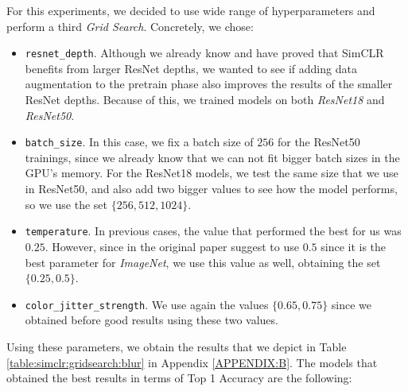 For this experiments, we decided to use wide range of hyperparameters and perform a third \emph{Grid Search}. Concretely, we chose:
\begin{itemize}
\item \lstinline{resnet_depth}. Although we already know and have proved that SimCLR benefits from larger ResNet depths, we wanted to see if adding data augmentation to the pretrain phase also improves the results of the smaller ResNet depths. Because of this, we trained models on both \emph{ResNet18} and \emph{ResNet50}.
\item \lstinline{batch_size}. In this case, we fix a batch size of $256$ for the ResNet50 trainings, since we already know that we can not fit bigger batch sizes in the GPU's memory. For the ResNet18 models, we test the same size that we use in ResNet50, and also add two bigger values to see how the model performs, so we use the set $\{256,512,1024\}$.
\item \lstinline{temperature}. In previous cases, the value that performed the best for us was $0.25$. However, since in the original paper suggest to use $0.5$ since it is the best parameter for \emph{ImageNet}, we use this value as well, obtaining the set $\{0.25,0.5\}$.
\item \lstinline{color_jitter_strength}. We use again the values $\{0.65,0.75\}$ since we obtained before good results using these two values.
\end{itemize}

Using these parameters, we obtain the results that we depict in Table \ref{table:simclr:gridsearch:blur} in Appendix \ref{APPENDIX:B}. The models that obtained the best results in terms of Top 1 Accuracy are the following:

\begin{table}[H]
    \caption{Best results for the experiment of adding gaussian blur to data augmentation.}
    \label{table:simclr:gridsearch:blur:best}
\end{table}

